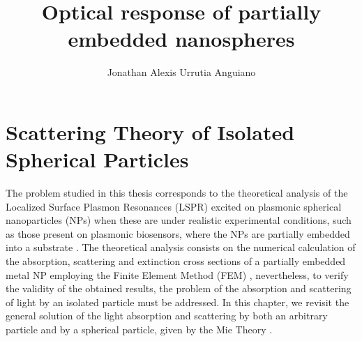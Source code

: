 \documentclass[11pt]{Latex/Classes/PhDthesisPSnPDF}
\author{Jonathan Alexis Urrutia Anguiano}
\title{Optical response of partially embedded nanospheres}
\begin{document}
%
\maketitle
\frontmatter

%
%
%


%
\setcounter{secnumdepth}{3} %
\setcounter{tocdepth}{3}    %

\tableofcontents            %


\mainmatter

\def\baselinestretch{1}                   %



\chapter{Scattering Theory of Isolated Spherical Particles}
  \label{ch:OpticalProperties}

  The problem studied in this thesis corresponds to the theoretical analysis of the Localized Surface Plasmon Resonances (LSPR)  excited on plasmonic spherical nanoparticles (NPs) when these are under realistic experimental conditions, such as those present on plasmonic biosensors, where the NPs are partially embedded into a substrate \cite{moirangthem_enhanced_2012}. The theoretical analysis consists on the numerical calculation of the absorption, scattering and extinction  cross sections of a partially embedded metal NP employing the Finite Element Method (FEM) , nevertheless, to verify the validity of the obtained results, the problem of the absorption and scattering of light by an isolated particle must be addressed. In this chapter, we revisit the general solution of the light absorption and scattering by both an arbitrary particle and by a spherical particle, given by the Mie Theory \cite{bohren_absorption_1983}.
\end{document}
